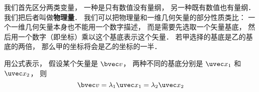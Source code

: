 

我们首先区分两类变量， 一种是只有数值没有量纲， 另一种既有数值也有量纲． 我们把后者叫做\textbf{物理量}． 我们可以把物理量和一维几何矢量的部分性质类比： 一个一维几何矢量本身也不能用一个数字描述， 而是需要先选取一个矢量基底， 然后用一个数字（即坐标）乘以这个基底表示这个矢量． 若甲选择的基底是乙的基底的两倍， 那么甲的坐标将会是乙的坐标的一半．

用公式表示， 假设某个矢量是 $\bvec v$， 两种不同的基底分别是 $\uvec x_1$ 和 $\uvec x_2$， 则
\begin{equation}
\bvec v = \lambda_1 \uvec x_1 = \lambda_2 \uvec x_2
\end{equation}
